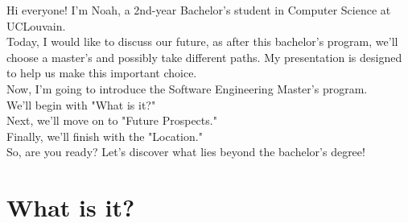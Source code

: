 \documentclass{article}
\begin{document}
Hi everyone! I'm Noah, a 2nd-year Bachelor’s student in Computer Science at UCLouvain.\\

Today, I would like to discuss our future, as after this bachelor’s program, we’ll choose a master’s and possibly take different paths. My presentation is designed to help us make this important choice.\\

Now, I’m going to introduce the Software Engineering Master’s program.\\
We’ll begin with "What is it?"\\
Next, we’ll move on to "Future Prospects." \\
Finally, we’ll finish with the "Location."\\

So, are you ready? Let’s discover what lies beyond the bachelor’s degree!

\section{What is it?}
\end{document}
